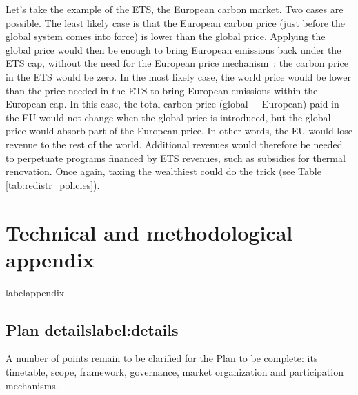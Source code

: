 \documentclass[a5paper,french,openany]{memoir}
\begin{document}
{{Let's take the example of the ETS, the European carbon market. Two cases are possible. The least likely case is that the European carbon price (just before the global system comes into force) is lower than the global price. Applying the global price would then be enough to bring European emissions back under the ETS cap, without the need for the European price mechanism~: the carbon price in the ETS would be zero. In the most likely case, the world price would be lower than the price needed in the ETS to bring European emissions within the European cap. In this case, the total carbon price (global + European) paid in the EU would not change when the global price is introduced, but the global price would absorb part of the European price. In other words, the EU would lose revenue to the rest of the world. Additional revenues would therefore be needed to perpetuate programs financed by ETS revenues, such as subsidies for thermal renovation. Once again, taxing the wealthiest could do the trick (see Table \ref{tab:redistr_policies}).











\appendix

\part*{Technical and methodological appendix}}label{appendix}

\chapter{Plan details{label:details}} 

A number of points remain to be clarified for the Plan to be complete: its timetable, scope, framework, governance, market organization and participation mechanisms. 

}
\end{document}
